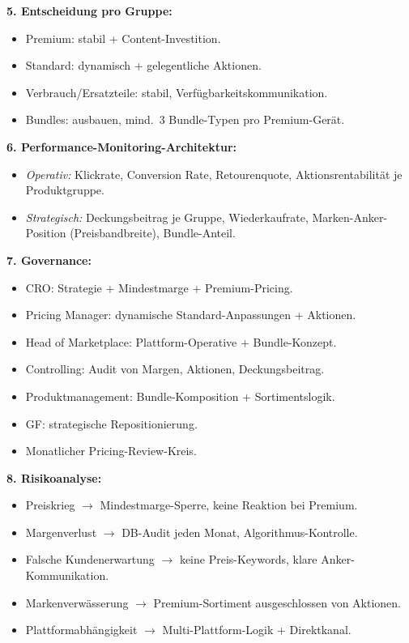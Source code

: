 \documentclass[11pt,a4paper,oneside]{article}
\begin{document}
\begin{loesungbox}
\textbf{5. Entscheidung pro Gruppe:}
\begin{itemize}
  \item Premium: stabil + Content-Investition.
  \item Standard: dynamisch + gelegentliche Aktionen.
  \item Verbrauch/Ersatzteile: stabil, Verfügbarkeitskommunikation.
  \item Bundles: ausbauen, mind.\ 3 Bundle-Typen pro Premium-Gerät.
\end{itemize}

\textbf{6. Performance-Monitoring-Architektur:}
\begin{itemize}
  \item \emph{Operativ:} Klickrate, Conversion Rate, Retourenquote, Aktionsrentabilität je Produktgruppe.
  \item \emph{Strategisch:} Deckungsbeitrag je Gruppe, Wiederkaufrate, Marken-Anker-Position (Preisbandbreite), Bundle-Anteil.
\end{itemize}

\textbf{7. Governance:}
\begin{itemize}
  \item CRO: Strategie + Mindestmarge + Premium-Pricing.
  \item Pricing Manager: dynamische Standard-Anpassungen + Aktionen.
  \item Head of Marketplace: Plattform-Operative + Bundle-Konzept.
  \item Controlling: Audit von Margen, Aktionen, Deckungsbeitrag.
  \item Produktmanagement: Bundle-Komposition + Sortimentslogik.
  \item GF: strategische Repositionierung.
  \item Monatlicher Pricing-Review-Kreis.
\end{itemize}

\textbf{8. Risikoanalyse:}
\begin{itemize}
  \item Preiskrieg $\rightarrow$ Mindestmarge-Sperre, keine Reaktion bei Premium.
  \item Margenverlust $\rightarrow$ DB-Audit jeden Monat, Algorithmus-Kontrolle.
  \item Falsche Kundenerwartung $\rightarrow$ keine Preis-Keywords, klare Anker-Kommunikation.
  \item Markenverwässerung $\rightarrow$ Premium-Sortiment ausgeschlossen von Aktionen.
  \item Plattformabhängigkeit $\rightarrow$ Multi-Plattform-Logik + Direktkanal.
\end{itemize}


\end{loesungbox}
\end{document}
